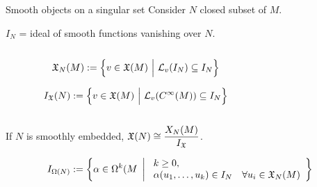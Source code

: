 \documentclass[beamer,10pt]{standalone}
\begin{document}
\begin{frame}[shrink]{Smooth objects on a singular set}
	Consider $N$ closed subset of $M$.
	\vfill
	\pause
	\begin{defblock}
	 $I_N$ = ideal of smooth functions vanishing over $N$.
	\end{defblock}
	\vfill
	\pause

	\begin{columns}[T]
		\setlength{\belowdisplayskip}{5pt}
		\begin{column}{.65\linewidth}
			\centering \it
				\begin{defblock}[v.f tangent to $N$]
					\begin{displaymath}
						\mathfrak{X}_N(M):=
						\left\lbrace
							v \in \mathfrak{X}(M)
						~\Big\vert~
							\mathcal{L}_v(I_N) \subseteq I_N
						\right\rbrace
					\end{displaymath}
				\end{defblock}
				\begin{defblock}[v.f vanishing on $N$]
					\begin{displaymath}
						I_{\mathfrak{X}}(N):=
						\left\lbrace
							v \in \mathfrak{X}(M)
						~\Big\vert~
							\mathcal{L}_v(C^\infty(M)) \subseteq I_N
						\right\rbrace
					\end{displaymath}				
				\end{defblock}				
		\end{column}	
		\begin{column}{.35\linewidth}
			\centering 
						
		\end{column}	
	\end{columns}			


		\begin{tcolorbox}[
		enhanced,frame hidden,borderline={0.5pt}{0pt}{blue},
		arc=5pt,colback=white,
		colbacktitle=white,]
			 If $N$ is smoothly embedded,  $\mathfrak{X}(N)\cong \dfrac{X_N(M)}{I_{\mathfrak{X}}}$.
		\end{tcolorbox}


		\begin{defblock}
			\begin{displaymath}
				I_{\Omega(N)}:=
				\left\lbrace
					\alpha\in\Omega^k(M
				~\left\vert~
					\begin{array}{l r}
						k\geq 0,~		\\		
						\alpha(u_1,\ldots,u_k) \in I_N & \forall u_i \in\mathfrak{X}_N(M)
					\end{array}
				\right\rbrace\right.
			\end{displaymath}
		\end{defblock}

\end{frame}
\end{document}

